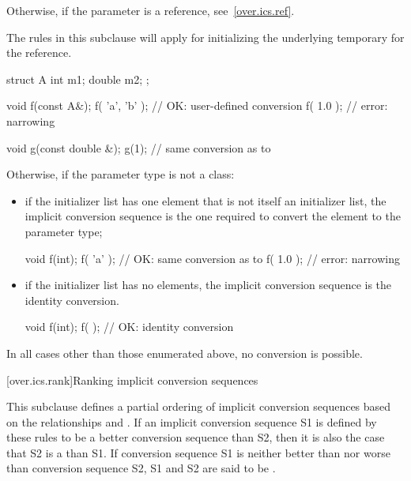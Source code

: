 \pnum
Otherwise, if the parameter is a reference, see~\ref{over.ics.ref}. \begin{note}
The rules in this subclause will apply for initializing the underlying temporary
for the reference. \end{note} \begin{example}
\begin{codeblock}
struct A {
  int m1;
  double m2;
};

void f(const A&);
f( {'a', 'b'} );        // OK:  user-defined conversion
f( {1.0} );             // error: narrowing

void g(const double &);
g({1});                 // same conversion as  to 
\end{codeblock}
\end{example}

\pnum
Otherwise, if the parameter type is not a class:

\begin{itemize}
\item if the initializer list has one element that is not itself an initializer list,
the implicit conversion sequence is the one required to convert the element to
the parameter type; \begin{example}
\begin{codeblock}
void f(int);
f( {'a'} );             // OK: same conversion as  to 
f( {1.0} );             // error: narrowing
\end{codeblock}
\end{example}

\item if the initializer list has no elements, the implicit conversion sequence
is the identity conversion. \begin{example}
\begin{codeblock}
void f(int);
f( { } );               // OK: identity conversion
\end{codeblock}
\end{example}
\end{itemize}

\pnum
In all cases other than those enumerated above, no conversion is possible.

[over.ics.rank]{Ranking implicit conversion sequences}

\pnum
This subclause defines a partial ordering of implicit conversion
sequences based on the relationships
and
.
If an implicit conversion sequence S1 is
defined by these rules to be a better conversion sequence than
S2, then it is also the case that S2 is a
than S1.
If conversion sequence S1 is neither better
than nor worse than conversion sequence S2, S1 and S2 are said to
be
.

